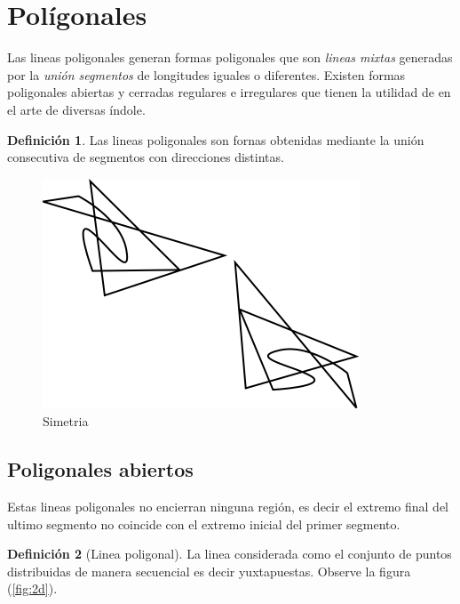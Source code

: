 \documentclass[16pt,]{krantz}
\theoremstyle{definition}
\newtheorem{definition}{Definición}[chapter]
\theoremstyle{definition}
\theoremstyle{definition}
\theoremstyle{definition}
\theoremstyle{remark}
\begin{document}
\hypertarget{poluxedgonales}{%
\section{Polígonales}\label{poluxedgonales}}

Las lineas poligonales generan formas poligonales que son \emph{lineas mixtas} generadas por la \emph{unión segmentos} de longitudes iguales o diferentes. Existen formas poligonales abiertas y cerradas regulares e irregulares que tienen la utilidad de en el arte de diversas índole.

\begin{definition}
\protect\hypertarget{def:poligonal}{}{\label{def:poligonal} }Las lineas poligonales son fornas obtenidas mediante la unión consecutiva de segmentos con direcciones distintas.
\end{definition}

\begin{figure}[!ht]

{\centering \includegraphics{simetria} 

}

\caption{Simetria}\label{fig:simetria}
\end{figure}

\hypertarget{poligonales-abiertos}{%
\subsection{Poligonales abiertos}\label{poligonales-abiertos}}

Estas lineas poligonales no encierran ninguna región, es decir el extremo final del ultimo segmento no coincide con el extremo inicial del primer segmento.

\begin{definition}[Linea poligonal]
\protect\hypertarget{def:poligono}{}{\label{def:poligono} {} }La linea considerada como el conjunto de puntos distribuidas de manera secuencial es decir yuxtapuestas. Observe la figura (\ref{fig:2d}).
\end{definition}
\end{document}

